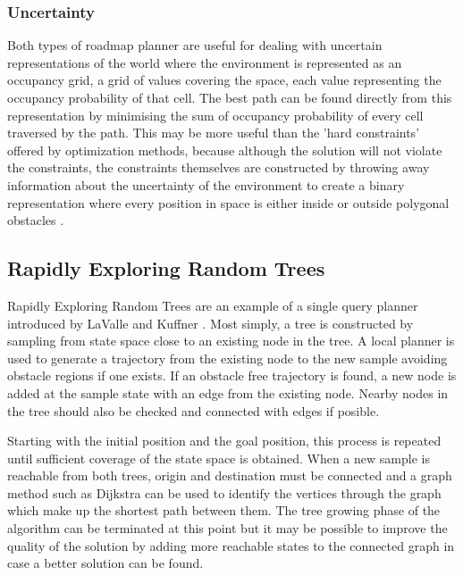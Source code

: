 \subsubsection{Uncertainty}
Both types of roadmap planner are useful for dealing with uncertain representations of the world where the environment is represented as an occupancy grid, a grid of values covering the space, each value representing the occupancy probability of that cell. The best path can be found directly from this representation by minimising the sum of occupancy probability of every cell traversed by the path. This may be more useful than the 'hard constraints' offered by optimization methods, because although the solution will not violate the constraints, the constraints themselves are constructed by throwing away information about the uncertainty of the environment to create a binary representation where every position in space is either inside or outside polygonal obstacles \cite{Pivtoraiko2009}.     

\subsection{Rapidly Exploring  Random Trees}
Rapidly Exploring Random Trees are an example of a single query planner introduced by LaValle and Kuffner \cite{LaValle2000}. Most simply, a tree is constructed by sampling from state space close to an existing node in the tree. A local planner is used to generate a trajectory from the existing node to the new sample avoiding obstacle regions if one exists. If an obstacle free trajectory is found, a new node is added at the sample state with an edge from the existing node. Nearby nodes in the tree should also be checked and connected with edges if posible. 

Starting with the initial position and the goal position, this process is repeated until sufficient coverage of the state space is obtained. When a new sample is reachable from both trees, origin and destination must be connected and a graph method such as Dijkstra can be used to identify the vertices through the graph which make up the shortest path between them. The tree growing phase of the algorithm can be terminated at this point but it may be possible to improve the quality of the solution by adding more reachable states to the connected graph in case  a better solution can be found.  
